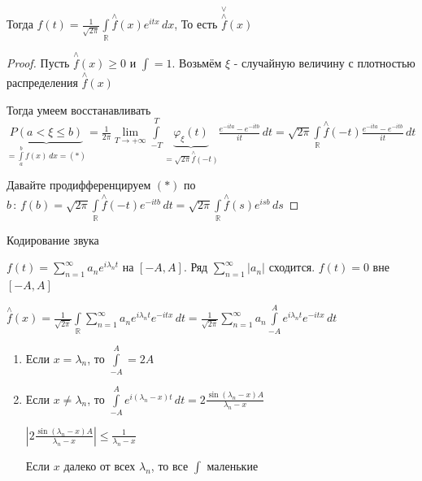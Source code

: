\begin{properties}
\begin{enumerate}
{            Тогда $f(t) = \frac{1}{\sqrt{2\pi}} \int\limits_{\mathbb{R}} \overset{\wedge}{f} (x) e^{itx} \, dx$, То есть $\overset{\vee}{\overset{\wedge}{f}} (x)$

            \begin{proof}
                Пусть $\overset{\wedge}{f} (x) \geqslant 0$ и $\int = 1$. Возьмём $\xi$ - случайную величину с плотностью распределения $\overset{\wedge}{f} (x)$

                Тогда умеем восстанавливать $\underbrace{P(a < \xi \leqslant b)}_{=\int\limits_a^b f(x) \, dx = (*)} = \frac{1}{2\pi} \lim\limits_{T \to +\infty} \int\limits_{-T}^T \underbrace{\varphi_{\xi} (t)}_{=\sqrt{2\pi} \overset{\wedge}{f} (-t)} \frac{e^{-ita} - e^{-itb}}{it} \, dt = \sqrt{2\pi} \int\limits_{\mathbb{R}} \overset{\wedge}{f} (-t) \frac{e^{-ita} - e^{-itb}}{it} \, dt$

                Давайте продифференцируем $(*)$ по $b \, : \, f(b) = \sqrt{2\pi} \int\limits_{\mathbb{R}} \overset{\wedge}{f} (-t) e^{-itb} \, dt = \sqrt{2\pi} \int\limits_{\mathbb{R}} \overset{\wedge}{f} (s) e^{isb}\, ds$
            \end{proof}
        }
    \end{enumerate}
\end{properties}

\begin{example}
    Кодирование звука

    $f(t) = \sum\limits_{n = 1}^\infty a_n e^{i\lambda_n t}$ на $[-A, A]$. Ряд $\sum\limits_{n = 1}^\infty |a_n|$ сходится. $f(t) = 0$ вне $[-A, A]$

    $\overset{\wedge}{f} (x) = \frac{1}{\sqrt{2\pi}} \int\limits_{\mathbb{R}} \sum\limits_{n = 1}^\infty a_n e^{i\lambda_n t} e^{-itx} \, dt = \frac{1}{\sqrt{2\pi}} \sum\limits_{n = 1}^\infty a_n \int\limits_{-A}^A e^{i\lambda_n t} e^{-itx} \, dt$

    \begin{enumerate}
        \item {
            Если $x = \lambda_n$, то $\int\limits_{-A}^A = 2A$
        }
        \item {
            Если $x \neq \lambda_n$, то $\int\limits_{-A}^A e^{i(\lambda_n - x)t} \, dt = 2 \frac{\sin (\lambda_n - x)A}{\lambda_n - x}$

            $\left| 2 \frac{\sin (\lambda_n - x)A}{\lambda_n - x} \right| \leqslant \frac{1}{\lambda_n - x}$

            Если $x$ далеко от всех $\lambda_n$, то все $\int$ маленькие
        }
    \end{enumerate}
\end{example}



